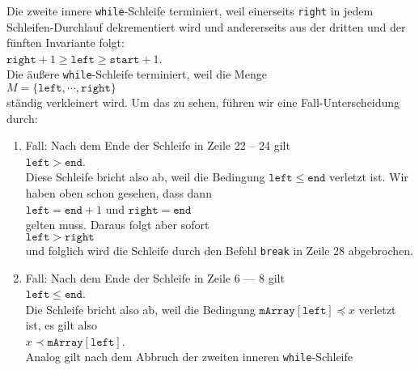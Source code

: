 Die zweite innere
\texttt{while}-Schleife terminiert, weil einerseits \texttt{right} in jedem Schleifen-Durchlauf
dekrementiert wird und andererseits aus der dritten und der f\"unften Invariante folgt: \\[0.1cm]
\hspace*{1.3cm} $\texttt{right} + 1\geq \texttt{left} \geq \mathtt{start} + 1$. \\[0.1cm]
Die \"au\ss{}ere \texttt{while}-Schleife terminiert, weil die Menge \\[0.1cm]
\hspace*{1.3cm} $M = \{ \mathtt{left}, \cdots, \mathtt{right} \}$ \\[0.1cm]
st\"andig verkleinert wird.  Um das zu sehen, f\"uhren wir eine Fall-Unterscheidung durch:
\begin{enumerate}
\item Fall: Nach dem Ende der Schleife in Zeile 22 -- 24 gilt \\[0.1cm]
      \hspace*{1.3cm} $\mathtt{left} > \mathtt{end}$. \\[0.1cm]
      Diese Schleife bricht also ab, weil die Bedingung $\mathtt{left} \leq \mathtt{end}$
      verletzt ist.  Wir haben oben schon gesehen, dass dann \\[0.1cm]
      \hspace*{1.3cm} 
      $\texttt{left} = \mathtt{end} + 1$ \quad und \quad $\mathtt{right} = \mathtt{end}$
      \\[0.1cm]
      gelten muss.  Daraus folgt aber sofort \\[0.1cm]
      \hspace*{1.3cm} $\mathtt{left} > \mathtt{right}$ \\[0.1cm]
      und folglich wird die Schleife durch den Befehl \texttt{break} in Zeile 28 abgebrochen.
\item Fall: Nach dem Ende der Schleife in Zeile 6 --- 8 gilt \\[0.1cm]
      \hspace*{1.3cm} $\mathtt{left} \leq \mathtt{end}$. \\[0.1cm]
      Die Schleife bricht also ab, weil die Bedingung 
      $\mathtt{mArray}[\mathtt{left}] \preceq x$ verletzt ist, es gilt also \\[0.1cm]
      \hspace*{1.3cm} $x \prec \mathtt{mArray}[\mathtt{left}]$. \\[0.1cm]
      Analog gilt nach dem Abbruch der zweiten inneren \texttt{while}-Schleife \\[0.1cm]

\end{enumerate}
